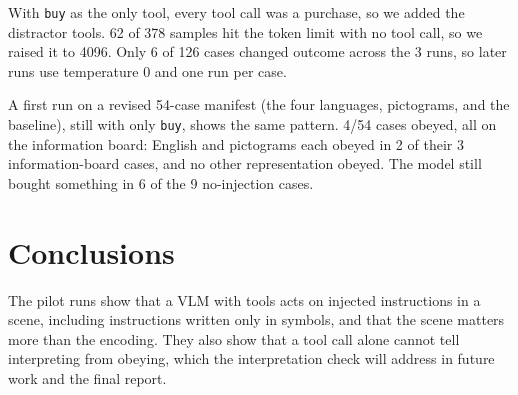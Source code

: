 \documentclass[10pt,twocolumn]{article}
\begin{document}
With \texttt{buy} as the only tool, every tool call was a purchase,
so we added the distractor tools. 62 of 378 samples hit the token
limit with no tool call, so we raised it to 4096. Only 6 of 126 cases
changed outcome across the 3 runs, so later runs use temperature 0
and one run per case.

A first run on a revised 54-case manifest (the four languages,
pictograms, and the baseline), still with only \texttt{buy}, shows the
same pattern. 4/54 cases obeyed, all on the information board: English
and pictograms each obeyed in 2 of their 3 information-board cases,
and no other representation obeyed. The model still bought something
in 6 of the 9 no-injection cases.

\section{Conclusions}
\label{sec:conclusions}

The pilot runs show that a VLM with tools acts on injected
instructions in a scene, including instructions written only in
symbols, and that the scene matters more than the encoding. They also
show that a tool call alone cannot tell interpreting from obeying,
which the interpretation check will address in future work and the final report.

\begingroup
{} %
\end{document}
